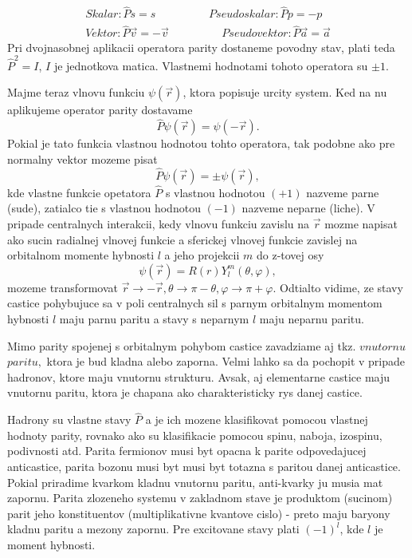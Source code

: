 \documentclass[../../main.tex]{subfiles}
\begin{document}
\begin{equation*}
\begin{gathered}
Skalar: \hat{P}s=s  \hspace{2cm} Pseudoskalar: \hat{P}p=-p    \\
Vektor: \hat{P}\vec{v}=-\vec{v}  \hspace{2cm} Pseudovektor: \hat{P}\vec{a}=\vec{a}
\end{gathered}
\end{equation*}
Pri dvojnasobnej aplikacii operatora parity dostaneme povodny stav, plati teda $\hat{P}^2=I$, $I$ je jednotkova matica. Vlastnemi hodnotami tohoto operatora su $\pm1$.\par
Majme teraz vlnovu funkciu $\psi(\vec{r})$, ktora popisuje urcity system. Ked na nu aplikujeme operator parity dostavame $$ \hat{P}\psi(\vec{r})=\psi(-\vec{r}).$$ Pokial je tato funkcia vlastnou hodnotou tohto operatora, tak podobne ako pre normalny vektor mozeme pisat
$$ \hat{P}\psi(\vec{r})=\pm \psi(\vec{r}),$$ kde vlastne funkcie opetatora $\hat{P}$ s vlastnou hodnotou $(+1)$ nazveme parne (sude), zatialco tie s vlastnou hodnotou $(-1)$ nazveme neparne (liche). V pripade centralnych interakcii, kedy vlnovu funkciu zavislu na $\vec{r}$ mozme napisat ako sucin radialnej vlnovej funkcie a sferickej vlnovej funkcie zavislej na orbitalnom momente hybnosti $l$ a jeho projekcii $m$ do z-tovej osy $$ \psi(\vec{r})= R(r)Y_l^m(\theta, \varphi),$$ mozeme transformovat $\vec{r}\rightarrow -\vec{r},\theta\rightarrow \pi - \theta,\varphi\rightarrow \pi+\varphi$. Odtialto vidime, ze stavy castice pohybujuce sa v poli centralnych sil s parnym orbitalnym momentom hybnosti $l$ maju parnu paritu a stavy s neparnym $l$ maju neparnu paritu.\par
Mimo parity spojenej s orbitalnym pohybom castice zavadziame aj tkz. $vnutornu$ $paritu,$ ktora je bud kladna alebo zaporna. Velmi lahko sa da pochopit v pripade hadronov, ktore maju vnutornu strukturu. Avsak, aj elementarne castice maju vnutornu paritu, ktora je chapana ako charakteristicky rys danej castice.\par
Hadrony su vlastne stavy $\hat{P}$ a je ich mozene klasifikovat pomocou vlastnej hodnoty parity, rovnako ako su klasifikacie pomocou spinu, naboja, izospinu, podivnosti atd. Parita fermionov musi byt opacna k parite odpovedajucej anticastice, parita bozonu musi byt musi byt totazna s paritou danej anticastice. Pokial priradime kvarkom kladnu vnutornu paritu, anti-kvarky ju musia mat zapornu. Parita zlozeneho systemu v zakladnom stave je produktom (sucinom) parit jeho konstituentov (multiplikativne kvantove cislo) - preto maju baryony kladnu paritu a mezony zapornu. Pre excitovane stavy plati $(-1)^l$, kde $l$ je moment hybnosti.\par
\end{document}
